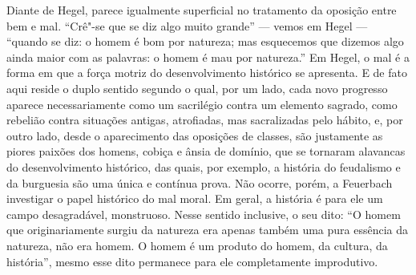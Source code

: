 Diante de
 Hegel,
parece igualmente superficial no tratamento da oposição entre bem e mal.
``Crê"-se que se diz algo muito grande'' --- vemos
em Hegel ---
``quando se diz: o homem é bom por natureza; mas esquecemos que dizemos
algo ainda maior com as palavras: o homem é mau por natureza.''
Em Hegel,
o mal é a forma em que a força motriz do desenvolvimento histórico se
apresenta. E de fato aqui reside o duplo sentido segundo o qual, por um
lado, cada novo progresso aparece necessariamente como um sacrilégio
contra um elemento sagrado, como rebelião contra situações antigas,
atrofiadas, mas sacralizadas pelo hábito, e, por outro lado, desde o
aparecimento das oposições de classes, são justamente as piores paixões
dos homens, cobiça e ânsia de domínio, que se 
tornaram alavancas do desenvolvimento histórico, das quais, por exemplo,
a história do feudalismo e da burguesia são uma única e contínua prova.
Não ocorre, porém, a
Feuerbach 
investigar o papel histórico do mal moral. Em geral, a história é para
ele um campo desagradável, monstruoso. Nesse sentido inclusive, o seu
dito: ``O homem que originariamente surgiu da natureza era apenas também
uma pura essência da natureza, não era homem. O homem é um produto do
homem, da cultura, da história'', mesmo esse
dito permanece para ele completamente improdutivo.

